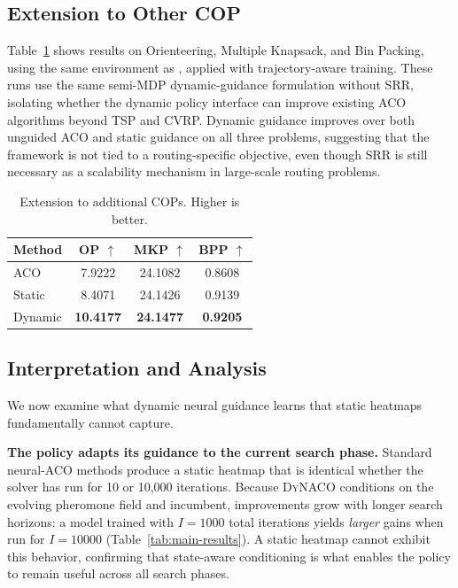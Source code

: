 \documentclass[sigconf]{acmart}
\newcommand{\DyNACO}{\textsc{DyNACO}}
\begin{document}
\subsection{Extension to Other COP}
Table~\ref{tab:other-cops} shows results on Orienteering, Multiple Knapsack, and Bin Packing, using the same environment as \cite{deepaco}, applied with trajectory-aware training.
These runs use the same semi-MDP dynamic-guidance formulation without SRR, isolating whether the dynamic policy interface can improve existing ACO algorithms beyond TSP and CVRP.
Dynamic guidance improves over both unguided ACO and static guidance on all three problems, suggesting that the framework is not tied to a routing-specific objective, even though SRR is still necessary as a scalability mechanism in large-scale routing problems.

\begin{table}[t]
\centering
\caption{Extension to additional COPs. Higher is better.}
\label{tab:other-cops}
\small
\renewcommand{\arraystretch}{0.85}
\begin{tabular*}{\columnwidth}{@{\extracolsep{\fill}}lccc@{}}
\toprule
Method & OP $\uparrow$ & MKP $\uparrow$ & BPP $\uparrow$ \\
\midrule
ACO & 7.9222 & 24.1082 & 0.8608 \\
Static & 8.4071 & 24.1426 & 0.9139 \\
Dynamic & \textbf{10.4177} & \textbf{24.1477} & \textbf{0.9205} \\
\bottomrule
\end{tabular*}
\end{table}

\subsection{Interpretation and Analysis}
\label{sec:analysis}

We now examine what dynamic neural guidance learns that static heatmaps fundamentally cannot capture.

\smallskip\noindent\textbf{The policy adapts its guidance to the current search phase.}
Standard neural-ACO methods produce a static heatmap that is identical whether the solver has run for 10 or 10,000 iterations.
Because \DyNACO{} conditions on the evolving pheromone field and incumbent, improvements grow with longer search horizons: a model trained with $I{=}1000$ total iterations yields \emph{larger} gains when run for $I{=}10000$ (Table~\ref{tab:main-results}).
A static heatmap cannot exhibit this behavior, confirming that state-aware conditioning is what enables the policy to remain useful across all search phases.
\end{document}
